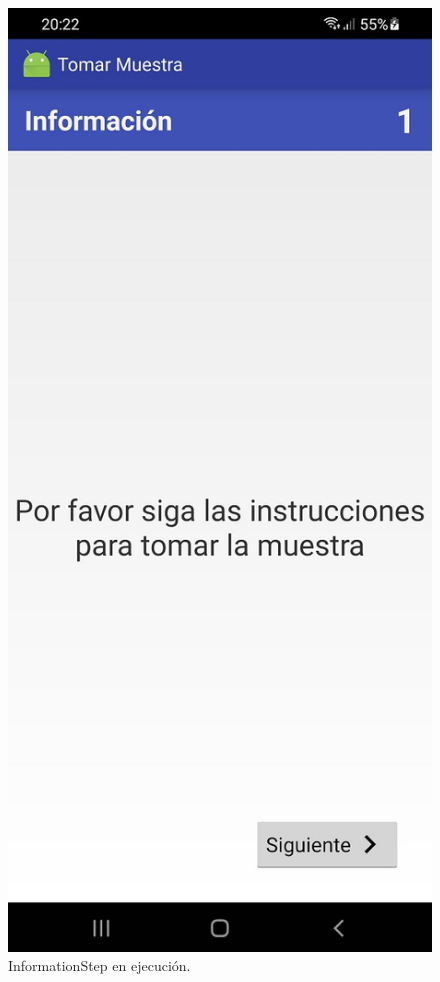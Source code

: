 \begin{figure}[H]
  \centering
    \includegraphics[scale=0.3]{50-anexos/C-steps/information_screen.jpg} 
    \caption{InformationStep en ejecución.}
\end{figure}



